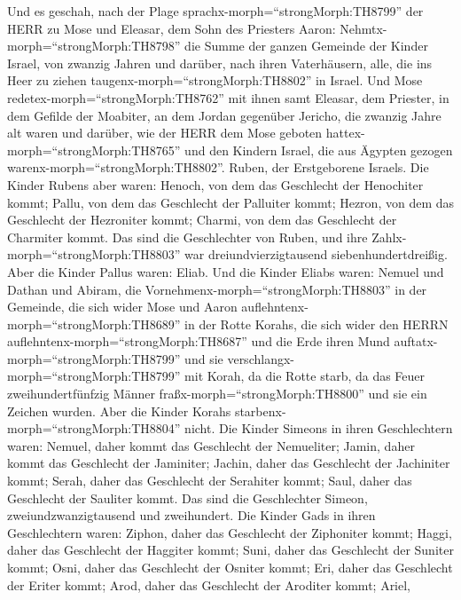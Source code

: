  Und es geschah, nach der Plage
sprachx-morph=``strongMorph:TH8799'' der HERR zu Mose und Eleasar, dem
Sohn des Priesters Aaron: 
Nehmtx-morph=``strongMorph:TH8798'' die Summe der ganzen Gemeinde der
Kinder Israel, von zwanzig Jahren und darüber, nach ihren Vaterhäusern,
alle, die ins Heer zu ziehen taugenx-morph=``strongMorph:TH8802'' in
Israel.  Und Mose redetex-morph=``strongMorph:TH8762'' mit
ihnen samt Eleasar, dem Priester, in dem Gefilde der Moabiter, an dem
Jordan gegenüber Jericho,  die zwanzig Jahre alt waren und
darüber, wie der HERR dem Mose geboten
hattex-morph=``strongMorph:TH8765'' und den Kindern Israel, die aus
Ägypten gezogen warenx-morph=``strongMorph:TH8802''.  Ruben,
der Erstgeborene Israels. Die Kinder Rubens aber waren: Henoch, von dem
das Geschlecht der Henochiter kommt; Pallu, von dem das Geschlecht der
Palluiter kommt;  Hezron, von dem das Geschlecht der
Hezroniter kommt; Charmi, von dem das Geschlecht der Charmiter kommt.
 Das sind die Geschlechter von Ruben, und ihre
Zahlx-morph=``strongMorph:TH8803'' war dreiundvierzigtausend
siebenhundertdreißig.  Aber die Kinder Pallus waren: Eliab.
 Und die Kinder Eliabs waren: Nemuel und Dathan und Abiram,
die Vornehmenx-morph=``strongMorph:TH8803'' in der Gemeinde, die sich
wider Mose und Aaron auflehntenx-morph=``strongMorph:TH8689'' in der
Rotte Korahs, die sich wider den HERRN
auflehntenx-morph=``strongMorph:TH8687''  und die Erde
ihren Mund auftatx-morph=``strongMorph:TH8799'' und sie
verschlangx-morph=``strongMorph:TH8799'' mit Korah, da die Rotte starb,
da das Feuer zweihundertfünfzig Männer
fraßx-morph=``strongMorph:TH8800'' und sie ein Zeichen wurden.
 Aber die Kinder Korahs
starbenx-morph=``strongMorph:TH8804'' nicht.  Die Kinder
Simeons in ihren Geschlechtern waren: Nemuel, daher kommt das Geschlecht
der Nemueliter; Jamin, daher kommt das Geschlecht der Jaminiter; Jachin,
daher das Geschlecht der Jachiniter kommt;  Serah, daher
das Geschlecht der Serahiter kommt; Saul, daher das Geschlecht der
Sauliter kommt.  Das sind die Geschlechter Simeon,
zweiundzwanzigtausend und zweihundert.  Die Kinder Gads in
ihren Geschlechtern waren: Ziphon, daher das Geschlecht der Ziphoniter
kommt; Haggi, daher das Geschlecht der Haggiter kommt; Suni, daher das
Geschlecht der Suniter kommt;  Osni, daher das Geschlecht
der Osniter kommt; Eri, daher das Geschlecht der Eriter kommt;
 Arod, daher das Geschlecht der Aroditer kommt; Ariel,
